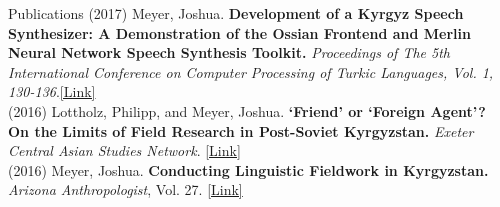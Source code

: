 \documentclass{resume} %
\begin{document}
\begin{minipage}{\textwidth}
\begin{rSection}{Publications}
{(2017)} {Meyer, Joshua.} {{\bf Development of a Kyrgyz Speech Synthesizer: A Demonstration of the Ossian Frontend and Merlin Neural Network Speech Synthesis Toolkit.}} {\textit{Proceedings of The 5th International Conference on Computer Processing of Turkic Languages, Vol. 1, 130-136}.}{\href{http://www.turklang.tatar/wp-content/uploads/2017/05/TurkLang-2017.-Tom1.pdf}{[Link]}}\\

{(2016)} {Lottholz, Philipp, and Meyer, Joshua.} {{\bf ‘Friend’ or ‘Foreign Agent’? On the Limits of Field Research in Post-Soviet Kyrgyzstan.}} {\textit{Exeter Central Asian Studies Network}.} { \href{https://blogs.exeter.ac.uk/excas/2016/04/14/friend-or-foreign-agent-on-the-limits-of-field-research-in-post-soviet-kyrgyzstan/}{[Link]}}\\

{(2016)} {Meyer, Joshua.} {\bf Conducting Linguistic Fieldwork in Kyrgyzstan.} {\textit{Arizona Anthropologist}, Vol. 27.} { \href{https://journals.uair.arizona.edu/index.php/arizanthro/article/viewFile/21375/20949}{[Link]}} \\

\end{rSection}

\end{minipage}




\end{document}
